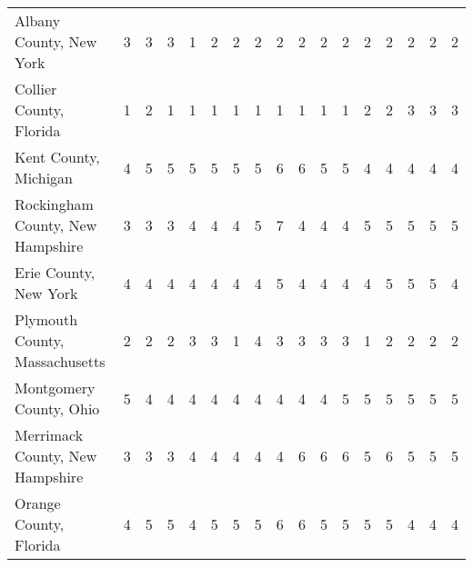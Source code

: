 \begin{landscape}
\begin{longtable}{lcccccccccccccccc}
	Albany County, New York & 3 & 3 & 3 & 1 & 2 & 2 & 2 & 2 & 2 & 2 & 2 & 2 & 2 & 2 & 2 & 2 \\
	Collier County, Florida & 1 & 2 & 1 & 1 & 1 & 1 & 1 & 1 & 1 & 1 & 1 & 2 & 2 & 3 & 3 & 3 \\
	Kent County, Michigan & 4 & 5 & 5 & 5 & 5 & 5 & 5 & 6 & 6 & 5 & 5 & 4 & 4 & 4 & 4 & 4 \\
	Rockingham County, New Hampshire & 3 & 3 & 3 & 4 & 4 & 4 & 5 & 7 & 4 & 4 & 4 & 5 & 5 & 5 & 5 & 5 \\
	Erie County, New York & 4 & 4 & 4 & 4 & 4 & 4 & 4 & 5 & 4 & 4 & 4 & 4 & 5 & 5 & 5 & 4 \\
	Plymouth County, Massachusetts & 2 & 2 & 2 & 3 & 3 & 1 & 4 & 3 & 3 & 3 & 3 & 1 & 2 & 2 & 2 & 2 \\
	Montgomery County, Ohio & 5 & 4 & 4 & 4 & 4 & 4 & 4 & 4 & 4 & 4 & 5 & 5 & 5 & 5 & 5 & 5 \\
	Merrimack County, New Hampshire & 3 & 3 & 3 & 4 & 4 & 4 & 4 & 4 & 6 & 6 & 6 & 5 & 6 & 5 & 5 & 5 \\
	Orange County, Florida & 4 & 5 & 5 & 4 & 5 & 5 & 5 & 6 & 6 & 5 & 5 & 5 & 5 & 4 & 4 & 4
	\end{longtable}


\newpage



\end{landscape}
